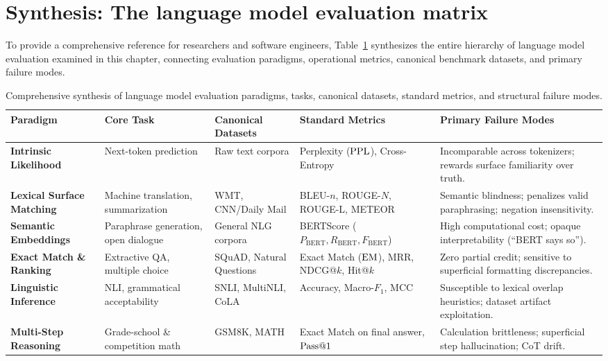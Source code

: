 \documentclass[../../main.tex]{subfiles}
\begin{document}
\section{Synthesis: The language model evaluation matrix}
\label{sec:evaluation_synthesis}

To provide a comprehensive reference for researchers and software engineers, Table~\ref{tab:evaluation_comprehensive_matrix} synthesizes the entire hierarchy of language model evaluation examined in this chapter, connecting evaluation paradigms, operational metrics, canonical benchmark datasets, and primary failure modes.

\begin{table}[htbp]
\centering
\scriptsize
\caption{Comprehensive synthesis of language model evaluation paradigms, tasks, canonical datasets, standard metrics, and structural failure modes.}
\label{tab:evaluation_comprehensive_matrix}
\begin{tabularx}{\textwidth}{l p{2.8cm} p{3.2cm} p{2.8cm} X}
\toprule
\textbf{Paradigm} & \textbf{Core Task} & \textbf{Canonical Datasets} & \textbf{Standard Metrics} & \textbf{Primary Failure Modes} \\
\midrule
\textbf{Intrinsic Likelihood} 
    & Next-token prediction & Raw text corpora & Perplexity ($\mathrm{PPL}$), Cross-Entropy & Incomparable across tokenizers; rewards surface familiarity over truth. \\
\addlinespace
\textbf{Lexical Surface Matching} 
    & Machine translation, summarization & WMT, CNN/Daily Mail & BLEU-$n$, ROUGE-$N$, ROUGE-L, METEOR & Semantic blindness; penalizes valid paraphrasing; negation insensitivity. \\
\addlinespace
\textbf{Semantic Embeddings} 
    & Paraphrase generation, open dialogue & General NLG corpora & BERTScore ($P_{\text{BERT}}, R_{\text{BERT}}, F_{\text{BERT}}$) & High computational cost; opaque interpretability (``BERT says so''). \\
\addlinespace
\textbf{Exact Match \& Ranking} 
    & Extractive QA, multiple choice & SQuAD, Natural Questions & Exact Match ($\mathrm{EM}$), MRR, NDCG@$k$, Hit@$k$ & Zero partial credit; sensitive to superficial formatting discrepancies. \\
\addlinespace
\textbf{Linguistic Inference} 
    & NLI, grammatical acceptability & SNLI, MultiNLI, CoLA & Accuracy, Macro-$F_1$, MCC & Susceptible to lexical overlap heuristics; dataset artifact exploitation. \\
\addlinespace
\textbf{Multi-Step Reasoning} 
    & Grade-school \& competition math & GSM8K, MATH & Exact Match on final answer, $\mathrm{Pass}@1$ & Calculation brittleness; superficial step hallucination; CoT drift. \\

\end{tabularx}
\end{table}
\end{document}
